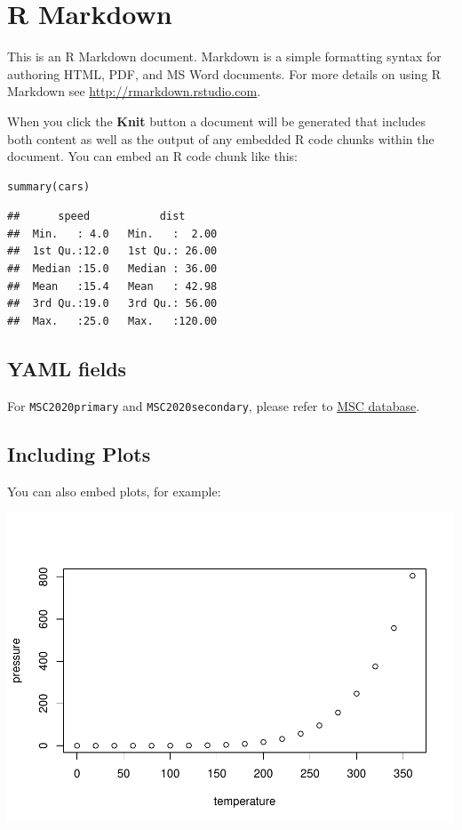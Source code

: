 \documentclass[ba]{imsart}
\numberwithin{equation}{section}
\theoremstyle{plain}
\begin{document}
\hypertarget{r-markdown}{%
\section{R Markdown}\label{r-markdown}}

This is an R Markdown document. Markdown is a simple formatting syntax for authoring HTML, PDF, and MS Word documents. For more details on using R Markdown see \url{http://rmarkdown.rstudio.com}.

When you click the \textbf{Knit} button a document will be generated that includes both content as well as the output of any embedded R code chunks within the document. You can embed an R code chunk like this:

\begin{verbatim}
summary(cars)
\end{verbatim}

\begin{verbatim}
##      speed           dist       
##  Min.   : 4.0   Min.   :  2.00  
##  1st Qu.:12.0   1st Qu.: 26.00  
##  Median :15.0   Median : 36.00  
##  Mean   :15.4   Mean   : 42.98  
##  3rd Qu.:19.0   3rd Qu.: 56.00  
##  Max.   :25.0   Max.   :120.00
\end{verbatim}

\hypertarget{yaml-fields}{%
\subsection{YAML fields}\label{yaml-fields}}

For \texttt{MSC2020primary} and \texttt{MSC2020secondary}, please refer to \href{https://mathscinet.ams.org/mathscinet/msc/msc2020.html}{MSC database}.

\hypertarget{including-plots}{%
\subsection{Including Plots}\label{including-plots}}

You can also embed plots, for example:

\includegraphics{Untitled_files/figure-latex/pressure-1.pdf}
\end{document}
